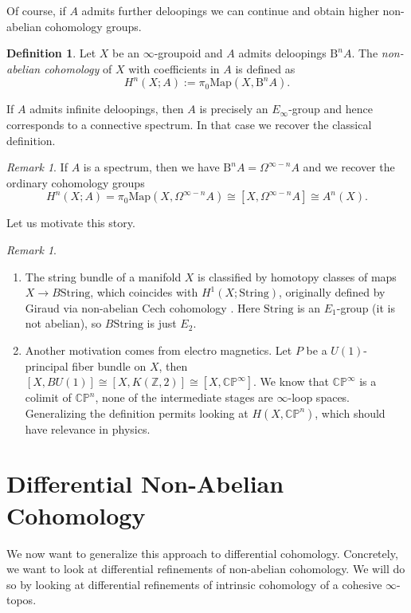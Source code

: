 \documentclass[a4paper]{book}
\newcommand{\bC}{\mathbb{C}}
\newcommand{\bP}{\mathbb{P}}
\newcommand{\bZ}{\mathbb{Z}}
\theoremstyle{definition}
\newtheorem{definition}[equation]{Definition}
\theoremstyle{remark}
\newtheorem{remark}[equation]{Remark}
\numberwithin{equation}{section}
\begin{document}
Of course, if $A$	admits further deloopings we can continue and obtain higher non-abelian cohomology groups.

\begin{definition}
	Let $X$ be an $\infty$-groupoid and $A$ admits deloopings $\mathrm{B}^n A$. The \emph{non-abelian cohomology} of $X$ with coefficients in $A$ is defined as
	\[	H^n(X; A) := \pi_0 \mathrm{Map}(X, \mathrm{B}^n A). \]
\end{definition}	

If $A$ admits infinite deloopings, then $A$ is precisely an $E_\infty$-group and hence corresponds to a connective spectrum. In that case we recover the classical definition.


\begin{remark}
	If $A$ is a spectrum, then we have $\mathrm{B}^n A = \Omega^{\infty - n} A$ and we recover the ordinary cohomology groups
	\[	H^n(X; A) = \pi_0 \mathrm{Map}(X, \Omega^{\infty - n} A) \cong [X, \Omega^{\infty - n} A] \cong A^n(X). \]
\end{remark}

Let us motivate this story.

\begin{remark} \label{rem:motivation}
	\begin{enumerate}
		\item The string bundle of a manifold $X$ is classified by homotopy classes of maps $X \to B \mathrm{String}$, which coincides with $H^1(X; \mathrm{String})$, originally defined by Giraud via non-abelian Cech cohomology \cite{giraud1971cohnonabelian}. Here $\mathrm{String}$ is an $E_1$-group (it is not abelian), so $B\mathrm{String}$ is just $E_2$.
		\item Another motivation comes from electro magnetics. Let $P$ be a $U(1)$-principal fiber bundle on $X$, then $[X,BU(1)] \cong [X, K(\bZ,2)] \cong [X,\bC\bP^\infty]$. We know that $\bC\bP^\infty$ is a colimit of $\bC\bP^n$, none of the intermediate stages are $\infty$-loop spaces. Generalizing the definition permits looking at $H(X,\bC\bP^n)$, which should have relevance in physics.
	\end{enumerate}
\end{remark}
	
\section{Differential Non-Abelian Cohomology}
We now want to generalize this approach to differential cohomology. Concretely, we want to look at differential refinements of non-abelian cohomology. We will do so by looking at differential refinements of intrinsic cohomology of a cohesive $\infty$-topos.
\end{document}
